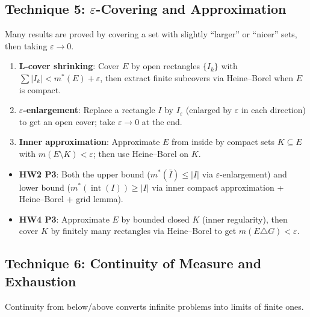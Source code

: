 \documentclass[11pt]{report}
\begin{document}
\subsection{Technique 5: $\varepsilon$-Covering and Approximation}

Many results are proved by covering a set with slightly ``larger'' or ``nicer'' sets, then taking $\varepsilon \to 0$.

\begin{rembox}[Strategy]
\begin{enumerate}[label=(\roman*)]
\item \textbf{L-cover shrinking}: Cover $E$ by open rectangles $\{I_k\}$ with $\sum |I_k| < m^*(E) + \varepsilon$, then extract finite subcovers via Heine--Borel when $E$ is compact.
\item \textbf{$\varepsilon$-enlargement}: Replace a rectangle $I$ by $I_\varepsilon$ (enlarged by $\varepsilon$ in each direction) to get an open cover; take $\varepsilon \to 0$ at the end.
\item \textbf{Inner approximation}: Approximate $E$ from inside by compact sets $K \subseteq E$ with $m(E \setminus K) < \varepsilon$; then use Heine--Borel on $K$.
\end{enumerate}
\end{rembox}

\begin{exbox}
\begin{itemize}
\item \textbf{HW2 P3}: Both the upper bound ($m^*(\bar{I}) \leq |I|$ via $\varepsilon$-enlargement) and lower bound ($m^*(\operatorname{int}(I)) \geq |I|$ via inner compact approximation + Heine--Borel + grid lemma).
\item \textbf{HW4 P3}: Approximate $E$ by bounded closed $K$ (inner regularity), then cover $K$ by finitely many rectangles via Heine--Borel to get $m(E \triangle G) < \varepsilon$.
\end{itemize}
\end{exbox}

\subsection{Technique 6: Continuity of Measure and Exhaustion}

Continuity from below/above converts infinite problems into limits of finite ones.
\end{document}
